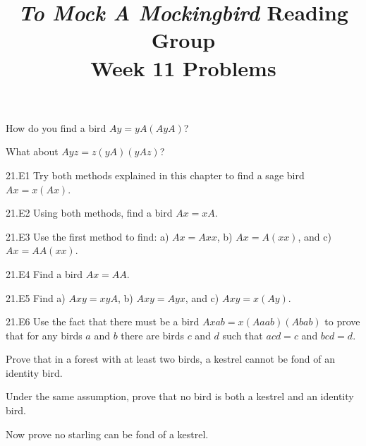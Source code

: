 \documentclass[12pt, letterpaper]{article}
\title{\emph{To Mock A Mockingbird} Reading Group\\Week 11 Problems}
\begin{document}
\maketitle

\disclaimer

\begin{prob}{21.1}  
How do you find a bird $Ay = yA(AyA)$?
\end{prob}

\begin{prob}{21.2}  
What about $Ayz = z(yA)(yAz)$?
\end{prob}

\begin{prob}{21.E1} 
Try both methods explained in this chapter to find a sage bird $Ax = x(Ax)$.
\end{prob}

\begin{prob}{21.E2} 
Using both methods, find a bird $Ax = xA$.
\end{prob}

\begin{prob}{21.E3} 
Use the first method to find: a) $Ax = Axx$, b) $Ax = A(xx)$, and c) $Ax = AA(xx)$.
\end{prob}

\begin{prob}{21.E4} 
Find a bird $Ax = AA$.
\end{prob}

\begin{prob}{21.E5} 
Find a) $Axy = xyA$, b) $Axy = Ayx$, and c) $Axy = x(Ay)$.
\end{prob}

\begin{prob}{21.E6} 
Use the fact that there must be a bird $Axab = x(Aaab)(Abab)$ to prove that for any birds $a$ and $b$ there are birds $c$ and $d$ such that $acd = c$ and $bcd = d$.
\end{prob}

\begin{prob}{22.1}  
Prove that in a forest with at least two birds, a kestrel cannot be fond of an identity bird.
\end{prob}

\begin{prob}{22.2}  
Under the same assumption, prove that no bird is both a kestrel and an identity bird.
\end{prob}

\begin{prob}{22.3}  
Now prove no starling can be fond of a kestrel.
\end{prob}
\end{document}
